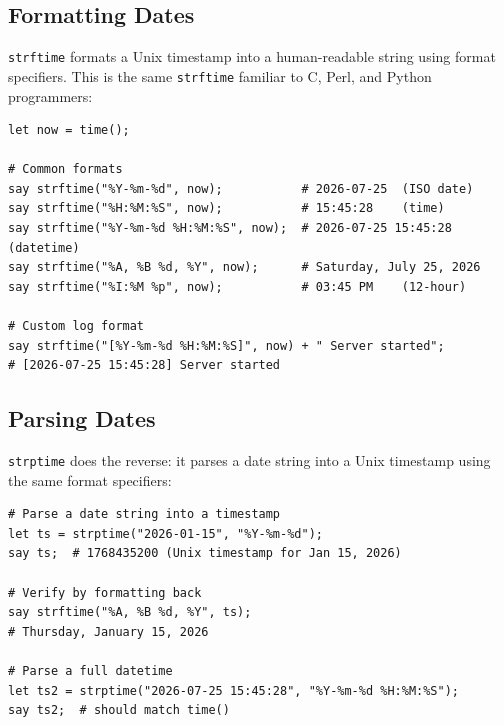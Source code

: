 \clearpage
\subsection{Formatting Dates}

\texttt{strftime} formats a Unix timestamp into a human-readable string using format specifiers. This is the same \texttt{strftime} familiar to C, Perl, and Python programmers:

\begin{tcolorbox}[colback=codebg, colframe=darkpurple, colbacktitle=darkpurple, title=\textbf{\textcolor{codegold}{Date Formatting with strftime}}, fonttitle=\bfseries, sharp corners]
\begin{lstlisting}
let now = time();

# Common formats
say strftime("%Y-%m-%d", now);           # 2026-07-25  (ISO date)
say strftime("%H:%M:%S", now);           # 15:45:28    (time)
say strftime("%Y-%m-%d %H:%M:%S", now);  # 2026-07-25 15:45:28 (datetime)
say strftime("%A, %B %d, %Y", now);      # Saturday, July 25, 2026
say strftime("%I:%M %p", now);           # 03:45 PM    (12-hour)

# Custom log format
say strftime("[%Y-%m-%d %H:%M:%S]", now) + " Server started";
# [2026-07-25 15:45:28] Server started
\end{lstlisting}
\end{tcolorbox}

\vspace{1.5cm}
\subsection{Parsing Dates}

\texttt{strptime} does the reverse: it parses a date string into a Unix timestamp using the same format specifiers:

\begin{tcolorbox}[colback=codebg, colframe=darkpurple, colbacktitle=darkpurple, title=\textbf{\textcolor{codegold}{Date Parsing with strptime}}, fonttitle=\bfseries, sharp corners]
\begin{lstlisting}
# Parse a date string into a timestamp
let ts = strptime("2026-01-15", "%Y-%m-%d");
say ts;  # 1768435200 (Unix timestamp for Jan 15, 2026)

# Verify by formatting back
say strftime("%A, %B %d, %Y", ts);
# Thursday, January 15, 2026

# Parse a full datetime
let ts2 = strptime("2026-07-25 15:45:28", "%Y-%m-%d %H:%M:%S");
say ts2;  # should match time()
\end{lstlisting}
\end{tcolorbox}

